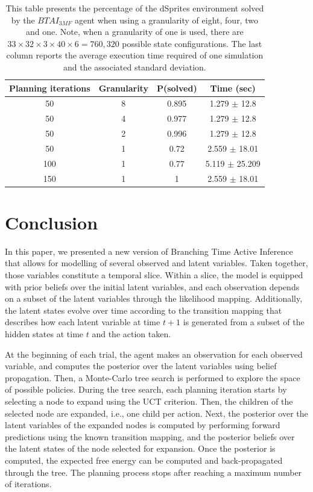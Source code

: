 \documentclass[twoside,11pt]{article}
\begin{document}
\begin{table}[H]
\centering
\begin{tabular}{ |c|c|c|c| }
 \hline
 Planning iterations & Granularity & P(solved) & Time (sec) \\
 \hline
 50 & 8 & 0.895 & 1.279 $\pm$ 12.8 \\
 \hline
 50 & 4 & 0.977 & 1.279 $\pm$ 12.8 \\
 \hline
 50 & 2 & 0.996 & 1.279 $\pm$ 12.8 \\
 \hline
 50 & 1 & 0.72 & 2.559 $\pm$ 18.01 \\
 \hline
 100 & 1 & 0.77 & 5.119 $\pm$ 25.209 \\
 \hline
 150 & 1 & 1 & 2.559 $\pm$ 18.01 \\
 \hline
\end{tabular}
\caption{This table presents the percentage of the dSprites environment solved by the $BTAI_{3MF}$ agent when using a granularity of eight, four, two and one. Note, when a granularity of one is used, there are $33 \times 32 \times 3 \times 40 \times 6 = 760,320$ possible state configurations. The last column reports the average execution time required of one simulation and the associated standard deviation.}
\label{tab:btai_3mf_dSprites_res}
\end{table}

\section{Conclusion} \label{sec:conclusion}

In this paper, we presented a new version of Branching Time Active Inference that allows for modelling of several observed and latent variables. Taken together, those variables constitute a temporal slice. Within a slice, the model is equipped with prior beliefs over the initial latent variables, and each observation depends on a subset of the latent variables through the likelihood mapping. Additionally, the latent states evolve over time according to the transition mapping that describes how each latent variable at time $t+1$ is generated from a subset of the hidden states at time $t$ and the action taken.

At the beginning of each trial, the agent makes an observation for each observed variable, and computes the posterior over the latent variables using belief propagation. Then, a Monte-Carlo tree search is performed to explore the space of possible policies. During the tree search, each planning iteration starts by selecting a node to expand using the UCT criterion. Then, the children of the selected node are expanded, i.e., one child per action. Next, the posterior over the latent variables of the expanded nodes is computed by performing forward predictions using the known transition mapping, and the posterior beliefs over the latent states of the node selected for expansion. Once the posterior is computed, the expected free energy can be computed and back-propagated through the tree. The planning process stops after reaching a maximum number of iterations.
\end{document}
